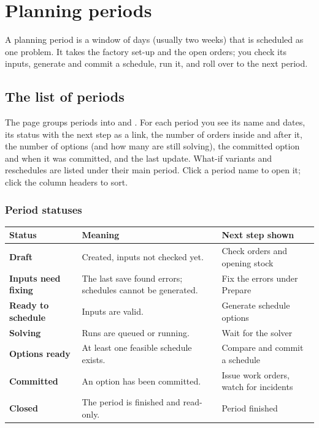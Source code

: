 \chapter{Planning periods}\label{ch:periods}

A planning period is a window of days (usually two weeks) that is scheduled as one problem. It takes the
factory set-up and the open orders; you check its inputs, generate and commit a schedule, run it, and roll
over to the next period.

\section{The list of periods}


The page groups periods into  and . For each period you see its name and
dates, its status with the next step as a link, the number of orders inside and after it, the number of
options (and how many are still solving), the committed option and when it was committed, and the last
update. What-if variants and reschedules are listed under their main period. Click a period name to open
it; click the column headers to sort.

\subsection{Period statuses}\label{sec:statuses}

\begin{center}
\begin{tabularx}{\linewidth}{>{\bfseries}p{3.7cm}Xp{4.3cm}}
\toprule
\rowcolor{white}Status & Meaning & Next step shown \\
\midrule
Draft & Created, inputs not checked yet. & Check orders and opening stock \\
Inputs need fixing & The last save found errors; schedules cannot be generated. & Fix the errors under Prepare \\
Ready to schedule & Inputs are valid. & Generate schedule options \\
Solving & Runs are queued or running. & Wait for the solver \\
Options ready & At least one feasible schedule exists. & Compare and commit a schedule \\
Committed & An option has been committed. & Issue work orders, watch for incidents \\
Closed & The period is finished and read-only. & Period finished \\
\bottomrule
\end{tabularx}
\end{center}

